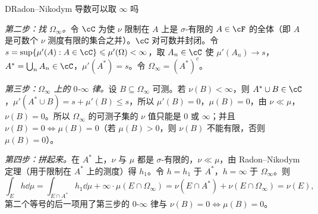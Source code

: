 \begin{probleme}[问题]{D}{Radon--Nikodym 导数可以取 \texorpdfstring{$\infty$}{∞} 吗}
\begin{questions}
\begin{solution}
\emph{第二步：找 $\Omega_\infty$。}令 $\cC$ 为使 $\nu$ 限制在 $A$ 上是 $\sigma$-有限的 $A\in\cF$ 的全体（即 $A$ 是可数个 $\nu$ 测度有限的集合之并）。$\cC$ 对可数并封闭。令 $s=\sup\{\mu'(A):A\in\cC\}\leqslant\mu'(\Omega)<\infty$，取 $A_n\in\cC$ 使 $\mu'(A_n)\to s$，$A^*=\bigcup_nA_n\in\cC$，$\mu'(A^*)=s$。令 $\Omega_\infty=(A^*)^c$。

\emph{第三步：$\Omega_\infty$ 上的 $0$-$\infty$ 律。}设 $B\subseteq\Omega_\infty$ 可测。若 $\nu(B)<\infty$，则 $A^*\cup B\in\cC$，$\mu'(A^*\cup B)=s+\mu'(B)\leqslant s$，所以 $\mu'(B)=0$，$\mu(B)=0$，由 $\nu\ll\mu$，$\nu(B)=0$。所以 $\Omega_\infty$ 的可测子集的 $\nu$ 值只能是 $0$ 或 $\infty$；并且 $\nu(B)=0\iff\mu(B)=0$（若 $\mu(B)>0$，则 $\nu(B)$ 不能有限，否则 $\mu(B)=0$）。

\emph{第四步：拼起来。}在 $A^*$ 上，$\nu$ 与 $\mu$ 都是 $\sigma$-有限的，$\nu\ll\mu$，由 Radon--Nikodym 定理（用于限制在 $A^*$ 上的测度）得 $h_1$。令 $h=h_1$ 于 $A^*$，$h=\infty$ 于 $\Omega_\infty$。则
\[
\int_Eh\dd\mu=\int_{E\cap A^*}h_1\dd\mu+\infty\cdot\mu(E\cap\Omega_\infty)=\nu(E\cap A^*)+\nu(E\cap\Omega_\infty)=\nu(E),
\]
第二个等号的后一项用了第三步的 $0$-$\infty$ 律与 $\nu(B)=0\iff\mu(B)=0$。
\end{solution}
\end{questions}
\end{probleme}

